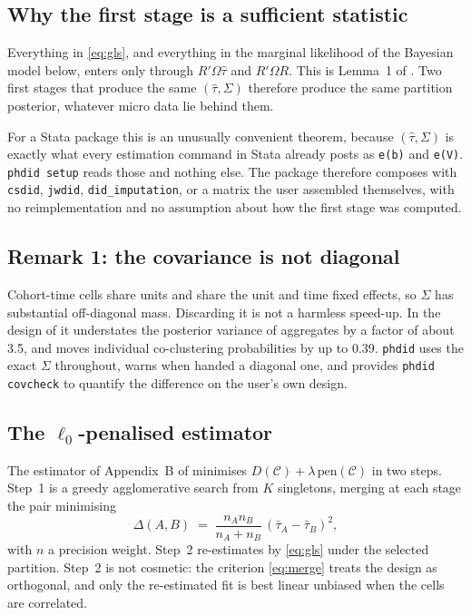 \documentclass{sj}
\begin{document}
\subsection{Why the first stage is a sufficient statistic}

Everything in \eqref{eq:gls}, and everything in the marginal likelihood of the
Bayesian model below, enters only through $R'\Omega\hat\tau$ and $R'\Omega R$.
This is Lemma~1 of \citet{AroraWagle2026}.  Two first stages that produce the
same $(\hat\tau, \Sigma)$ therefore produce the same partition posterior,
whatever micro data lie behind them.

For a Stata package this is an unusually convenient theorem, because
$(\hat\tau, \Sigma)$ is exactly what every estimation command in Stata already
posts as \texttt{e(b)} and \texttt{e(V)}.  \texttt{phdid setup} reads those
and nothing else.  The package therefore composes with \texttt{csdid},
\texttt{jwdid}, \texttt{did\_imputation}, or a matrix the user assembled
themselves, with no reimplementation and no assumption about how the first
stage was computed.

\subsection{Remark 1: the covariance is not diagonal}

Cohort-time cells share units and share the unit and time fixed effects, so
$\Sigma$ has substantial off-diagonal mass.  Discarding it is not a harmless
speed-up.  In the design of \citet{AroraWagle2026} it understates the
posterior variance of aggregates by a factor of about 3.5, and moves
individual co-clustering probabilities by up to 0.39.  \texttt{phdid} uses the
exact $\Sigma$ throughout, warns when handed a diagonal one, and provides
\texttt{phdid covcheck} to quantify the difference on the user's own design.

\subsection{The $\ell_0$-penalised estimator}

The estimator of Appendix~B of \citet{AroraWagle2026} minimises
$D(\mathcal{C}) + \lambda \,\mathrm{pen}(\mathcal{C})$ in two steps.
Step~1 is a greedy agglomerative search from $K$ singletons, merging at each
stage the pair minimising
\begin{equation}
  \Delta(A,B) \;=\; \frac{n_A n_B}{n_A + n_B}\,(\bar\tau_A - \bar\tau_B)^2,
  \label{eq:merge}
\end{equation}
with $n$ a precision weight.  Step~2 re-estimates by \eqref{eq:gls} under the
selected partition.  Step~2 is not cosmetic: the criterion \eqref{eq:merge}
treats the design as orthogonal, and only the re-estimated fit is best linear
unbiased when the cells are correlated.
\end{document}
